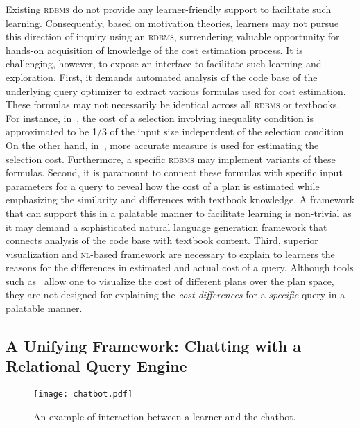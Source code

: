 \documentclass[11pt]{article}
\begin{document}
Existing \textsc{rdbms} do not provide any learner-friendly support to facilitate such learning. Consequently, based on motivation theories, learners may not pursue this direction of inquiry using an \textsc{rdbms}, surrendering valuable opportunity for hands-on acquisition of knowledge of the cost estimation process. It is challenging, however, to expose an interface to facilitate such learning and exploration. First, it demands automated analysis of the code base of the underlying query optimizer to extract various formulas used for cost estimation. These formulas may not necessarily be identical across all \textsc{rdbms} or textbooks. For instance, in~\cite{dbtext}, the cost of a selection involving inequality condition is approximated to be 1/3 of the input size independent of the selection condition. On the other hand, in~\cite{cow}, more accurate measure is used for estimating the selection cost.  Furthermore, a specific \textsc{rdbms} may implement variants of these formulas. Second, it is paramount to connect these formulas with specific input parameters for a query to reveal how the cost of a plan is estimated while emphasizing the similarity and differences with textbook knowledge. A framework that can support this in a palatable manner to facilitate learning is non-trivial as it may demand a sophisticated natural language generation framework that connects analysis of the code base with textbook content. Third, superior visualization and \textsc{nl}-based framework are necessary to explain to learners the reasons for the differences in estimated and actual cost of a query. Although tools such as~\cite{picasso} allow one to visualize the cost of different plans over the plan space,  they are not designed for explaining the \emph{cost differences} for a \emph{specific} query in a palatable manner. 

\subsection{A Unifying Framework: Chatting with a Relational Query Engine} 

\begin{figure}[t]
\centering
\texttt{[image: chatbot.pdf]}
\vspace{0ex}\caption{An example of interaction between a learner and the chatbot.}
\label{fig:chatbot}
\vspace{0ex}\end{figure}
\end{document}
